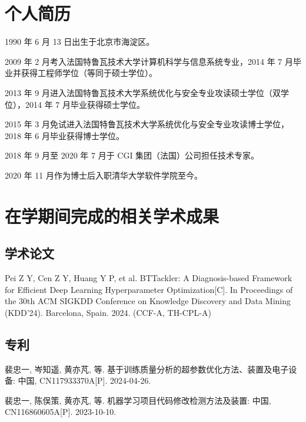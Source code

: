 
\begin{resume}

  \section*{个人简历}

  1990 年 6 月 13 日出生于北京市海淀区。

  2009 年 2 月考入法国特鲁瓦技术大学计算机科学与信息系统专业，2014 年 7 月毕业并获得工程师学位（等同于硕士学位）。

  2013 年 9 月进入法国特鲁瓦技术大学系统优化与安全专业攻读硕士学位（双学位），2014 年 7 月毕业获得硕士学位。

  2015 年 3 月免试进入法国特鲁瓦技术大学系统优化与安全专业攻读博士学位，2018 年 6 月毕业获得博士学位。

  2018 年 9 月至 2020 年 7 月于 CGI 集团（法国）公司担任技术专家。

  2020 年 11 月作为博士后入职清华大学软件学院至今。


  \section*{在学期间完成的相关学术成果}

  \subsection*{学术论文}

  \begin{achievements}
    \item Pei Z Y, Cen Z Y, Huang Y P, et al. BTTackler: A Diagnosis-based Framework for Efficient Deep Learning Hyperparameter Optimization[C]. In Proceedings of the 30th ACM SIGKDD Conference on Knowledge Discovery and Data Mining (KDD'24). Barcelona, Spain. 2024. (CCF-A, TH-CPL-A)
  \end{achievements}


  \subsection*{专利}

  \begin{achievements}
    \item 裴忠一, 岑知遥, 黄亦芃, 等. 基于训练质量分析的超参数优化方法、装置及电子设备: 中国, CN117933370A[P]. 2024-04-26.
    \item 裴忠一, 陈俣策, 黄亦芃, 等. 机器学习项目代码修改检测方法及装置: 中国, CN116860605A[P]. 2023-10-10.
  \end{achievements}

\end{resume}
